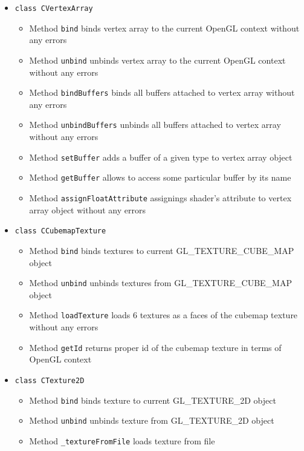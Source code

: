 \documentclass{report}
\begin{document}
\begin{itemize}
%
%	
\item \texttt{class CVertexArray}
		\begin{itemize}
			\item Method \texttt{bind} binds vertex array to the current OpenGL context without any errors
			\item Method \texttt{unbind} unbinds vertex array to the current OpenGL context without any errors
			\item Method \texttt{bindBuffers} binds all buffers attached to vertex array without any errors
			\item Method \texttt{unbindBuffers} unbinds all buffers attached to vertex array without any errors
			\item Method \texttt{setBuffer} adds a buffer of a given type to vertex array object
			\item Method \texttt{getBuffer} allows to access some particular buffer by its name
			\item Method \texttt{assignFloatAttribute} assignings shader's attribute to vertex array object without any errors
		\end{itemize}		
%
%	
\item \texttt{class CCubemapTexture}
		\begin{itemize}
			\item Method \texttt{bind} binds textures to current GL\_TEXTURE\_CUBE\_MAP object
			\item Method \texttt{unbind} unbinds textures from GL\_TEXTURE\_CUBE\_MAP object
			\item Method \texttt{loadTexture} loads 6 textures as a faces of the cubemap texture without any errors
			\item Method \texttt{getId} returns proper id of the cubemap texture in terms of OpenGL context
		\end{itemize}

%
%	
\item \texttt{class CTexture2D}
		\begin{itemize}
			\item Method \texttt{bind} binds texture to current GL\_TEXTURE\_2D object
			\item Method \texttt{unbind} unbinds texture from GL\_TEXTURE\_2D object
			\item Method \texttt{\_textureFromFile} loads texture from file
		\end{itemize}


\end{itemize}
\end{document}
